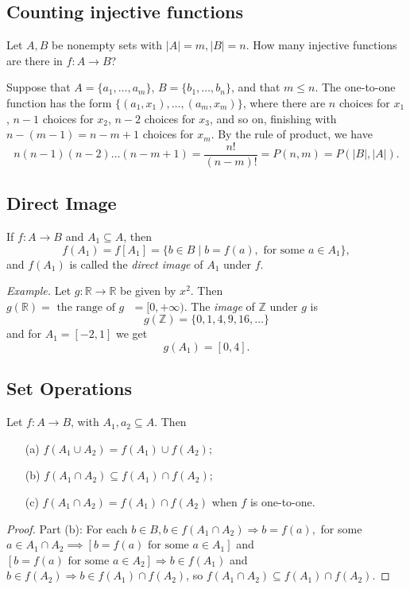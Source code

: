 \documentclass[11pt]{article}
\begin{document}
    \subsection{Counting injective functions}

    Let \(A,B\) be nonempty sets with \(|A| = m, |B| = n.\) How many injective functions are there in \(f:A \rightarrow B\)?

    \vspace{1em}

    Suppose that \(A = \{a_1, \dots, a_m\}\), \(B = \{b_1, \dots, b_n\}\), and that \(m \leq n\). The one-to-one function has the form \(\{(a_1,x_1), \dots, (a_m, x_m)\}\), where there are $n$ choices for \(x_1\), \(n-1\) choices for \(x_2\), \(n-2\) choices for \(x_3\), and so on, finishing with \(n - (m - 1) = n - m + 1\) choices for \(x_m\). By the rule of product, we have \[n(n-1)(n-2) \dots (n - m + 1) = \frac{n!}{(n - m)!} = P(n,m) = P(|B|,|A|).\]

    \subsection{Direct Image}

    If \(f: A \rightarrow B\) and \(A_1 \subseteq A\), then \[f(A_1) = f[A_1] = \{b \in B \mid b = f(a), \text{ for some } a \in A_1\},\] and \(f(A_1)\) is called the \emph{direct image} of \(A_1\) under $f$.

    \vspace{1em}

    \emph{Example.} Let \(g: \mathbb{R} \rightarrow \mathbb{R}\) be given by \(x^2\). Then \(g(\mathbb{R}) = \text{ the range of $g$ } = [0, + \infty).\) The \emph{image} of \(\mathbb{Z}\) under $g$ is \[g(\mathbb{Z}) = \{0,1,4,9,16, \dots\}\] and for \(A_1 = [-2,1]\) we get \[g(A_1) = [0,4].\]

    \subsection{Set Operations}

    Let \(f: A \rightarrow B\), with \(A_1, a_2 \subseteq A\). Then
    \begin{enumerate}
        \item[(a)] \(f(A_1 \cup A_2) = f(A_1) \cup f(A_2);\)
        \item[(b)] \(f(A_1 \cap A_2) \subseteq f(A_1) \cap f(A_2)\);
        \item[(c)] \(f(A_1 \cap A_2) = f(A_1) \cap f(A_2)\) when $f$ is one-to-one.   
    \end{enumerate}
    \begin{proof}
        Part (b): For each \(b \in B, b \in f(A_1 \cap A_2) \Rightarrow b = f(a),\) for some \(a \in A_1 \cap A_2 \implies [b = f(a) \text{ for some } a \in A_1]\) and \([b = f(a) \text{ for some } a \in A_2] \Rightarrow b \in f(A_1)\) and \(b \in f(A_2) \Rightarrow b \in f(A_1) \cap f(A_2)\), so \(f(A_1 \cap A_2) \subseteq f(A_1) \cap f(A_2)\).
    \end{proof}
\end{document}
